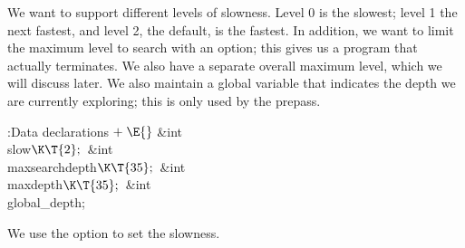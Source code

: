 We want to support different levels of slowness.  Level 0 is the
slowest; level 1 the next fastest, and level 2, the default, is the
fastest.  In addition, we want to limit the maximum level to search
with an option; this gives us a program that actually terminates.
We also have a separate overall maximum level, which we will
discuss later.  We also maintain a global variable that indicates
the depth we are currently exploring; this is only used by the
prepass.

\Y\B\4:Data declarations\X${}\mathrel+\E{}$\6
\&{int} \\{slow}${}\K\T{2};{}$\6
\&{int} \\{maxsearchdepth}${}\K\T{35};{}$\6
\&{int} \\{maxdepth}${}\K\T{35};{}$\6
\&{int} \\{global\_depth};\par
\fi

We use the  option to set the slowness.

